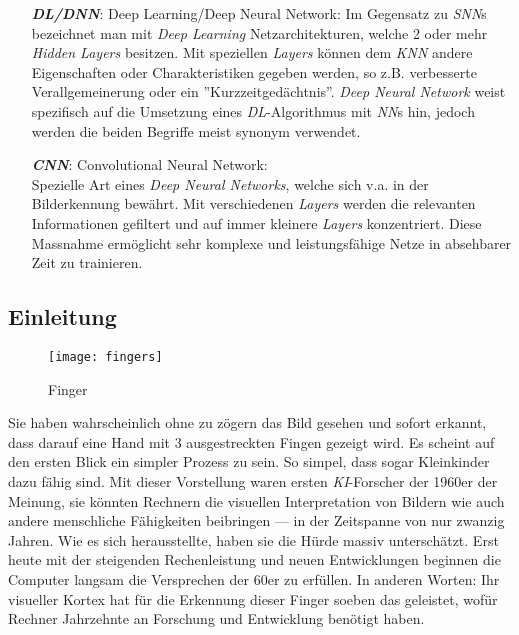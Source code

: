 \begin{itemize}[leftmargin=2cm]
	\item[\textbf{\textit{DL/DNN}}:] Deep Learning/Deep Neural Network:
	Im Gegensatz zu \textit{SNN}s bezeichnet man mit \textit{Deep Learning} Netzarchitekturen, welche 2 oder mehr \textit{Hidden Layers} besitzen. Mit speziellen \textit{Layers} können dem \textit{KNN} andere Eigenschaften oder Charakteristiken gegeben werden, so z.B. verbesserte Verallgemeinerung oder ein ''Kurzzeitgedächtnis''. \textit{Deep Neural Network} weist spezifisch auf die Umsetzung eines \textit{DL}-Algorithmus mit \textit{NN}s hin, jedoch werden die beiden Begriffe meist synonym verwendet\cite{dl}.
	
	\item[\textbf{\textit{CNN}}:] Convolutional Neural Network:\\
	 Spezielle Art eines \textit{Deep Neural Networks}, welche sich v.a. in der Bilderkennung bewährt. Mit verschiedenen \textit{Layers} werden die relevanten Informationen gefiltert und auf immer kleinere \textit{Layers} konzentriert. Diese Massnahme ermöglicht sehr komplexe und leistungsfähige Netze in absehbarer Zeit zu trainieren.
	
\end{itemize}

\newpage

\subsection{Einleitung}


\begin{figure}[h]
	\centering
	\texttt{[image: fingers]}
	\caption[Finger, https://img.livestrongcdn.com/, 2017, Artikel 541001]{Finger}
\end{figure}

Sie haben wahrscheinlich ohne zu zögern das Bild gesehen und sofort erkannt, dass darauf eine Hand mit 3 ausgestreckten Fingen gezeigt wird. Es scheint auf den ersten Blick ein simpler Prozess zu sein. So simpel, dass sogar Kleinkinder dazu fähig sind. Mit dieser Vorstellung waren ersten \textit{KI}-Forscher der 1960er der Meinung, sie könnten Rechnern die visuellen Interpretation von Bildern wie auch andere menschliche Fähigkeiten beibringen --- in der Zeitspanne von nur zwanzig Jahren. Wie es sich herausstellte, haben sie die Hürde massiv unterschätzt. Erst heute mit der steigenden Rechenleistung und neuen Entwicklungen beginnen die Computer langsam die Versprechen der 60er zu erfüllen. In anderen Worten: Ihr visueller Kortex hat für die Erkennung dieser Finger soeben das geleistet, wofür Rechner Jahrzehnte an Forschung und Entwicklung benötigt haben.\\



